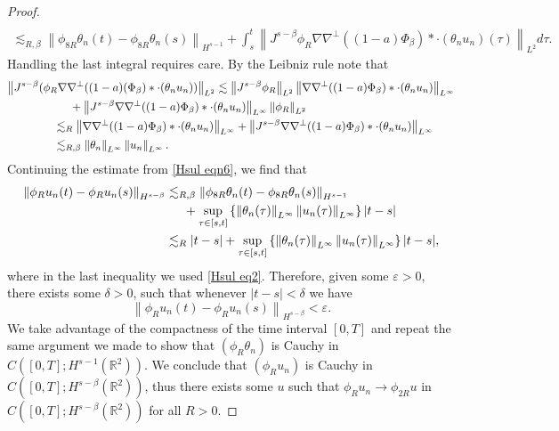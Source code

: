 \documentclass[12pt,xcolor=svgnames]{amsart}
\newcommand{\R}{\mathbb{R}}
\newcommand{\eps}{\varepsilon}
\newcommand{\abs}[1]{\mid\!#1\!\mid}
\newcommand{\norm}[2]{\left\lVert#1\right\rVert_{#2}}
\begin{document}
\begin{proof}
\begin{multline}
\\
\lesssim_{R,\beta} \norm{\phi_{8R}\theta_n(t)-\phi_{8R}\theta_n(s)}{H^{s-1}}  
+ \int_s^t \norm{J^{s-\beta}\phi_R\nabla\nabla^{\perp}((1-a)\Phi_{\beta})\ast \cdot (\theta_nu_n)(\tau)}{L^2} d\tau.
\end{multline}
Handling the last integral requires care. By the Leibniz rule note that
\begin{align*}
\norm{J^{s-\beta}(\phi_R\nabla\nabla^{\perp}((1-a)(\Phi_{\beta})\ast \cdot (\theta_nu_n))}{L^2}& \lesssim \norm{J^{s-\beta}\phi_R}{L^2}\norm{\nabla\nabla^{\perp}((1-a)\Phi_{\beta})\ast \cdot (\theta_nu_n)}{L^{\infty}}\\ & \hspace{-4.5cm}+\norm{J^{s-\beta}\nabla\nabla^{\perp}((1-a)\Phi_{\beta})\ast \cdot (\theta_nu_n)}{L^{\infty}}\norm{\phi_R}{L^2}\\ &\hspace{-5cm}\lesssim_R \norm{\nabla\nabla^{\perp}((1-a)\Phi_{\beta})\ast \cdot (\theta_nu_n)}{L^{\infty}}
+\norm{J^{s-\beta}\nabla\nabla^{\perp}((1-a)\Phi_{\beta})\ast \cdot (\theta_nu_n)}{L^{\infty}}
\\
&\hspace{-5cm}\lesssim_{R,\beta} \norm{\theta_n}{L^{\infty}}\norm{u_n}{L^{\infty}}.
\end{align*}
Continuing the estimate from \eqref{Hsul eqn6}, we find that 
\begin{align*}
\norm{\phi_Ru_n(t)-\phi_Ru_n(s)}{H^{s-\beta}}&\lesssim_{R,\beta}  \norm{\phi_{8R}\theta_n(t)-\phi_{8R}\theta_n(s)}{H^{s-1}}\\& \hspace{.5cm}+\sup_{\tau \in [s,t]}\left\{ \norm{\theta_n(\tau)}{L^{\infty}}\norm{u_n(\tau)}{L^{\infty}}\right\}|t-s|
\\ &\lesssim_R |t-s| + \sup_{\tau \in [s,t]}\left\{ \norm{\theta_n(\tau)}{L^{\infty}}\norm{u_n(\tau)}{L^{\infty}}\right\}|t-s|,
\end{align*}
where in the last inequality we used \eqref{Hsul eq2}.
Therefore, given some $\eps>0$, there exists some $\delta>0$, such that whenever $\abs{t-s}<\delta$ we have
\begin{equation}
\norm{\phi_Ru_n(t)-\phi_Ru_n(s)}{H^{s-\beta}} < \eps.
\end{equation}
We take advantage of the compactness of the time interval $[0,T]$ and repeat the same argument we made to show that $(\phi_R\theta_n)$ is Cauchy in $C([0,T];H^{s-1}(\R^2))$. We conclude that $(\phi_Ru_n)$ is Cauchy in $C([0,T];H^{s-\beta}(\R^2))$, thus there exists some $u$ such that $\phi_Ru_n \to \phi_{2R} u$ in  $C([0,T];H^{s-\beta}(\R^2))$ for all $R>0$.

\end{proof}
\end{document}
